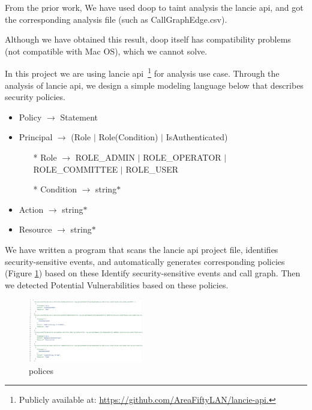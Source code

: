 From the prior work, We have used doop to taint analysis the lancie api, and got
the corresponding analysis file (such as CallGraphEdge.csv).

Although we have obtained this result, doop itself has compatibility problems
(not compatible with Mac OS), which we cannot solve.

In this project we are using lancie api~\footnote{Publicly available at:
  \url{https://github.com/AreaFiftyLAN/lancie-api.}} for analysis use case.
%
Through the analysis of lancie api, we design a simple modeling language below
that describes security policies.
\begin{itemize}
  \item Policy $\rightarrow$ Statement
  \item Principal $\rightarrow$ (Role $|$ Role(Condition) $|$ IsAuthenticated)
        \begin{itemize}
          \item[*] Role $\rightarrow$ ROLE\_ADMIN $|$ ROLE\_OPERATOR $|$ ROLE\_COMMITTEE $|$ ROLE\_USER
          \item[*] Condition $\rightarrow$ string$*$
        \end{itemize}
  \item Action $\rightarrow$ string$*$
  \item Resource $\rightarrow$ string$*$
\end{itemize}

We have written a program that scans the lancie api project file, identifies
security-sensitive events, and automatically generates corresponding
policies (Figure \ref{fig:policies}) based on these Identify security-sensitive
events and call graph. Then we detected Potential Vulnerabilities based on these
policies.
\begin{figure}[htp]
  \centering
  \includegraphics[width=0.45\textwidth]{img/policies.png}
  \caption{polices}
  \label{fig:policies}
\end{figure}

